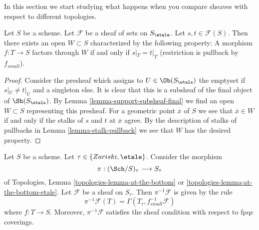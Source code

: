 \noindent
In this section we start studying what happens when you compare
sheaves with respect to different topologies.

\begin{lemma}
\label{lemma-where-sections-are-equal}
Let $S$ be a scheme. Let $\mathcal{F}$ be a sheaf of sets on $S_\etale$.
Let $s, t \in \mathcal{F}(S)$. Then there exists an open $W \subset S$
characterized by the following property: A morphism $f : T \to S$
factors through $W$ if and only if $s|_T = t|_T$ (restriction is
pullback by $f_{small}$).
\end{lemma}

\begin{proof}
Consider the presheaf which assigns to $U \in \Ob(S_\etale)$ the emptyset
if $s|_U \not = t|_U$ and a singleton else. It is clear that this is
a subsheaf of the final object of $\Sh(S_\etale)$. By
Lemma \ref{lemma-support-subsheaf-final}
we find an open $W \subset S$ representing this presheaf.
For a geometric point $\overline{x}$ of $S$ we see that $\overline{x} \in W$
if and only if the stalks of $s$ and $t$ at $\overline{x}$ agree.
By the description of stalks of pullbacks in
Lemma \ref{lemma-stalk-pullback}
we see that $W$ has the desired property.
\end{proof}

\begin{lemma}
\label{lemma-describe-pullback}
Let $S$ be a scheme. Let $\tau \in \{Zariski, \etale\}$. Consider the morphism
$$
\pi : (\Sch/S)_\tau \longrightarrow S_\tau
$$
of Topologies, Lemma \ref{topologies-lemma-at-the-bottom} or
\ref{topologies-lemma-at-the-bottom-etale}. Let $\mathcal{F}$ be a sheaf on
$S_\tau$. Then $\pi^{-1}\mathcal{F}$ is given by the rule
$$
\pi^{-1}\mathcal{F}(T) = \Gamma(T_\tau, f_{small}^{-1}\mathcal{F})
$$
where $f : T \to S$. Moreover, $\pi^{-1}\mathcal{F}$ satisfies the
sheaf condition with respect to fpqc coverings.
\end{lemma}

